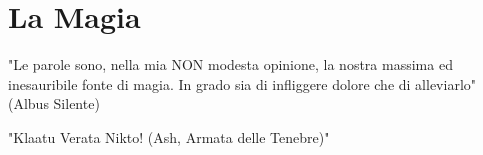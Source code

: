 \documentclass[a4paper,twoside,openany]{book}
\begin{document}
	\setcounter{page}{1}



\section{La Magia}


\label{la-magia}
\begin{tcolorbox}[enhanced,arc=5pt,boxrule=0.3pt]{
"Le parole sono, nella mia NON modesta opinione, la nostra massima ed inesauribile fonte di magia. In grado sia di infliggere dolore che di alleviarlo" (Albus Silente)

		\medskip

"Klaatu Verata Nikto! (Ash, Armata delle Tenebre)"

} \end{tcolorbox}
\end{document}
